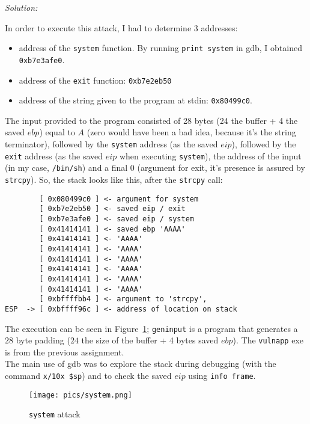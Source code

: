 \documentclass[a4paper,11pt]{article}
\newenvironment{solution}%
{\par{\noindent\small\textit{Solution:}}\vspace{-12pt}\begin{framed}}%
{\end{framed}\par}
\begin{document}
\ifsolution
\begin{solution}
In order to execute this attack, I had to determine 3 addresses:
\begin{itemize}
  \item address of the \texttt{system} function. By running \texttt{print system} in gdb, I obtained
  \texttt{0xb7e3afe0}.
  \item address of the \texttt{exit} function: \texttt{0xb7e2eb50}
  \item address of the string given to the program at stdin: \texttt{0x80499c0}.
\end{itemize}

The input provided to the program consisted of 28 bytes (24 the buffer + 4 the saved $ebp$) equal to $A$
(zero would have been a bad idea, because it's the string terminator), followed by the \texttt{system}
address (as the saved $eip$), followed by the \texttt{exit} address (as the saved $eip$ when executing
\texttt{system}), the address of the input (in my case, \texttt{/bin/sh}) and a final 0 (argument for exit, it's presence
is assured by \texttt{strcpy}). So, the stack looks like this, after the \texttt{strcpy} call:
\begin{lstlisting}
        [ 0x080499c0 ] <- argument for system
        [ 0xb7e2eb50 ] <- saved eip / exit
        [ 0xb7e3afe0 ] <- saved eip / system
        [ 0x41414141 ] <- saved ebp 'AAAA'
        [ 0x41414141 ] <- 'AAAA'
        [ 0x41414141 ] <- 'AAAA'
        [ 0x41414141 ] <- 'AAAA'
        [ 0x41414141 ] <- 'AAAA'
        [ 0x41414141 ] <- 'AAAA'
        [ 0x41414141 ] <- 'AAAA'
        [ 0xbffffbb4 ] <- argument to 'strcpy',
ESP  -> [ 0xbffff96c ] <- address of location on stack
\end{lstlisting}

The execution can be seen in Figure~\ref{fig:system}; \texttt{geninput} is a program that generates
a $28$ byte padding ($24$ the size of the buffer + 4 bytes saved $ebp$). The \texttt{vulnapp} exe is from
the previous assignment.\\
The main use of gdb was to explore the stack during debugging (with the command \texttt{x/10x \$sp})
and to check the saved $eip$ using \texttt{info frame}.

\end{solution}\fi

\begin{figure}[H] \center
  \texttt{[image: pics/system.png]}
  \caption{\texttt{system} attack}
  \label{fig:system}
\end{figure}
\end{document}
